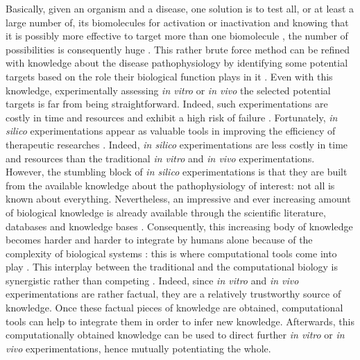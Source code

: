 \documentclass[oneside,a4paper,onecolumn,notitlepage,final]{article}
\begin{document}
Basically, given an organism and a disease, one solution is to test all, or at least a large number of, its biomolecules for activation or inactivation and knowing that it is possibly more effective to target more than one biomolecule \cite{zimmermann2007multi}, the number of possibilities is consequently huge \cite{ohlstein2000drug}. This rather brute force method can be refined with knowledge about the disease pathophysiology by identifying some potential targets based on the role their biological function plays in it \cite{gibbs2000mechanism}. Even with this knowledge, experimentally assessing \textit{in vitro} or \textit{in vivo} the selected potential targets is far from being straightforward. Indeed, such experimentations are costly in time and resources and exhibit a high risk of failure \cite{kaitin2010deconstructing}. Fortunately, \textit{in silico} experimentations appear as valuable tools in improving the efficiency of therapeutic researches \cite{ma2010silico,noble1999biological}. Indeed, \textit{in silico} experimentations are less costly in time and resources than the traditional \textit{in vitro} and \textit{in vivo} experimentations. However, the stumbling block of \textit {in silico} experimentations is that they are built from the available knowledge about the pathophysiology of interest: not all is known about everything. Nevertheless, an impressive and ever increasing amount of biological knowledge is already available through the scientific literature, databases and knowledge bases \cite{chen2002ttd,whirl2012pharmacogenomics,kanehisa2000kegg,croft2011reactome,wishart2008drugbank}. Consequently, this increasing body of knowledge becomes harder and harder to integrate by humans alone because of the complexity of biological systems \cite{kitano2002systems}: this is where computational tools come into play \cite{kitano2002computational}. This interplay between the traditional and the computational biology is synergistic rather than competing \cite{di2006vivo}. Indeed, since \textit{in vitro} and \textit{in vivo} experimentations are rather factual, they are a relatively trustworthy source of knowledge. Once these factual pieces of knowledge are obtained, computational tools can help to integrate them in order to infer new knowledge. Afterwards, this computationally obtained knowledge can be used to direct further \textit{in vitro} or \textit{in vivo} experimentations, hence mutually potentiating the whole.
\end{document}
